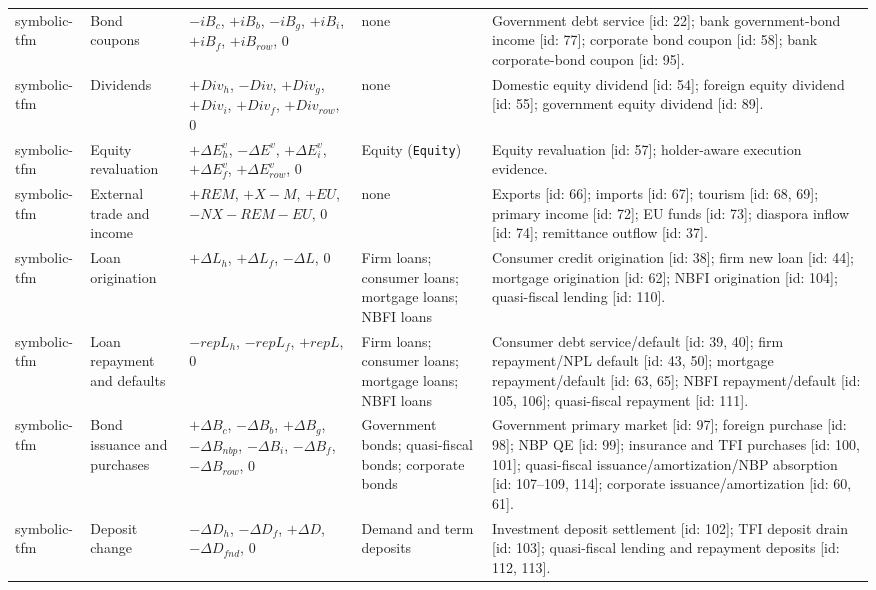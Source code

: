 \begin{landscape}
\begin{longtable}{@{}L{2.4cm}L{3.2cm}L{4.2cm}L{4.6cm}L{7.0cm}@{}}
symbolic-tfm & Bond coupons & $-iB_c$, $+iB_b$, $-iB_g$, $+iB_i$, $+iB_f$, $+iB_{row}$, $0$ & none & Government debt service [id: 22]; bank government-bond income [id: 77]; corporate bond coupon [id: 58]; bank corporate-bond coupon [id: 95]. \\
symbolic-tfm & Dividends & $+Div_h$, $-Div$, $+Div_g$, $+Div_i$, $+Div_f$, $+Div_{row}$, $0$ & none & Domestic equity dividend [id: 54]; foreign equity dividend [id: 55]; government equity dividend [id: 89]. \\
symbolic-tfm & Equity revaluation & $+\Delta E_h^v$, $-\Delta E^v$, $+\Delta E_i^v$, $+\Delta E_f^v$, $+\Delta E_{row}^v$, $0$ & Equity (\texttt{Equity}) & Equity revaluation [id: 57]; holder-aware execution evidence. \\
symbolic-tfm & External trade and income & $+REM$, $+X-M$, $+EU$, $-NX-REM-EU$, $0$ & none & Exports [id: 66]; imports [id: 67]; tourism [id: 68, 69]; primary income [id: 72]; EU funds [id: 73]; diaspora inflow [id: 74]; remittance outflow [id: 37]. \\
symbolic-tfm & Loan origination & $+\Delta L_h$, $+\Delta L_f$, $-\Delta L$, $0$ & Firm loans; consumer loans; mortgage loans; NBFI loans & Consumer credit origination [id: 38]; firm new loan [id: 44]; mortgage origination [id: 62]; NBFI origination [id: 104]; quasi-fiscal lending [id: 110]. \\
symbolic-tfm & Loan repayment and defaults & $-repL_h$, $-repL_f$, $+repL$, $0$ & Firm loans; consumer loans; mortgage loans; NBFI loans & Consumer debt service/default [id: 39, 40]; firm repayment/NPL default [id: 43, 50]; mortgage repayment/default [id: 63, 65]; NBFI repayment/default [id: 105, 106]; quasi-fiscal repayment [id: 111]. \\
symbolic-tfm & Bond issuance and purchases & $+\Delta B_c$, $-\Delta B_b$, $+\Delta B_g$, $-\Delta B_{nbp}$, $-\Delta B_i$, $-\Delta B_f$, $-\Delta B_{row}$, $0$ & Government bonds; quasi-fiscal bonds; corporate bonds & Government primary market [id: 97]; foreign purchase [id: 98]; NBP QE [id: 99]; insurance and TFI purchases [id: 100, 101]; quasi-fiscal issuance/amortization/NBP absorption [id: 107--109, 114]; corporate issuance/amortization [id: 60, 61]. \\
symbolic-tfm & Deposit change & $-\Delta D_h$, $-\Delta D_f$, $+\Delta D$, $-\Delta D_{fnd}$, $0$ & Demand and term deposits & Investment deposit settlement [id: 102]; TFI deposit drain [id: 103]; quasi-fiscal lending and repayment deposits [id: 112, 113]. \\
\bottomrule
\end{longtable}
\end{landscape}
